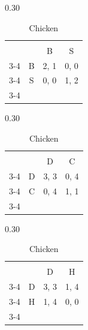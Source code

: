 \begin{table}[htbp]
\centering
\caption{Social Dillemas}
\label{tab:social}

\begin{subtable}{0.30\textwidth}
\centering
\caption{BoS}
\begin{tabular}{cccc}
                          &                        & \multicolumn{2}{c}{} \\  %
                          &                        & B                         & S                         \\ \cline{3-4} 
\multirow{2}{*}{}         & \multicolumn{1}{c|}{B} & \multicolumn{1}{c|}{2, 1} & \multicolumn{1}{c|}{0, 0} \\ \cline{3-4} 
                          & \multicolumn{1}{c|}{S} & \multicolumn{1}{c|}{0, 0} & \multicolumn{1}{c|}{1, 2} \\ \cline{3-4} 
\end{tabular}
\end{subtable}
\begin{subtable}{0.30\textwidth}
\centering
\caption{PD}
\begin{tabular}{cccc}
                          &                        & \multicolumn{2}{c}{} \\  %
                          &                        & D                         & C                         \\ \cline{3-4} 
\multirow{2}{*}{}         & \multicolumn{1}{c|}{D} & \multicolumn{1}{c|}{3, 3} & \multicolumn{1}{c|}{0, 4} \\ \cline{3-4} 
                          & \multicolumn{1}{c|}{C} & \multicolumn{1}{c|}{0, 4} & \multicolumn{1}{c|}{1, 1} \\ \cline{3-4} 
\end{tabular}
\end{subtable}
\begin{subtable}{0.30\textwidth}
\centering
\caption{Chicken}
\begin{tabular}{cccc}
                          &                        & \multicolumn{2}{c}{} \\  %
                          &                        & D                         & H                         \\ \cline{3-4} 
\multirow{2}{*}{}         & \multicolumn{1}{c|}{D} & \multicolumn{1}{c|}{3, 3} & \multicolumn{1}{c|}{1, 4} \\ \cline{3-4} 
                          & \multicolumn{1}{c|}{H} & \multicolumn{1}{c|}{1, 4} & \multicolumn{1}{c|}{0, 0} \\ \cline{3-4} 
\end{tabular}
\end{subtable}

\end{table}


